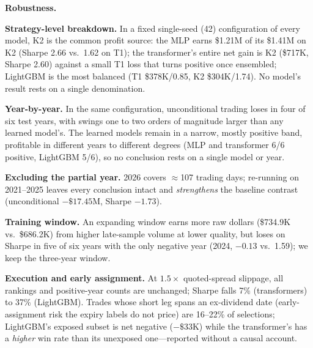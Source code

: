 \documentclass[sigconf,review,anonymous]{acmart}
\begin{document}
\medskip\noindent\textbf{Robustness.}
\label{sec:robustness}

\noindent\textbf{Strategy-level breakdown.} In a fixed single-seed (42) configuration of every model, K2 is the common profit source: the MLP earns \$1.21M of its \$1.41M on K2 (Sharpe 2.66 vs.\ 1.62 on T1); the transformer's entire net gain is K2 (\$717K, Sharpe 2.60) against a small T1 loss that turns positive once ensembled; LightGBM is the most balanced (T1 \$378K/0.85, K2 \$304K/1.74). No model's result rests on a single denomination.

\noindent\textbf{Year-by-year.} In the same configuration, unconditional trading loses in four of six test years, with swings one to two orders of magnitude larger than any learned model's. The learned models remain in a narrow, mostly positive band, profitable in different years to different degrees (MLP and transformer 6/6 positive, LightGBM 5/6), so no conclusion rests on a single model or year.

\noindent\textbf{Excluding the partial year.} 2026 covers $\approx$107 trading days; re-running on 2021--2025 leaves every conclusion intact and \emph{strengthens} the baseline contrast (unconditional $-\$17.45$M, Sharpe $-1.73$).

\noindent\textbf{Training window.} An expanding window earns more raw dollars (\$734.9K vs.\ \$686.2K) from higher late-sample volume at lower quality, but loses on Sharpe in five of six years with the only negative year (2024, $-0.13$ vs.\ 1.59); we keep the three-year window.

\noindent\textbf{Execution and early assignment.} At $1.5\times$ quoted-spread slippage, all rankings and positive-year counts are unchanged; Sharpe falls 7\% (transformers) to 37\% (LightGBM). Trades whose short leg spans an ex-dividend date (early-assignment risk the expiry labels do not price) are 16--22\% of selections; LightGBM's exposed subset is net negative ($-\$33$K) while the transformer's has a \emph{higher} win rate than its unexposed one---reported without a causal account.
\end{document}
